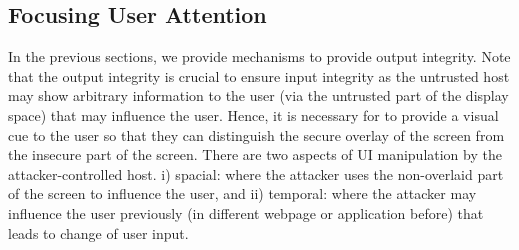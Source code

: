 



\subsection{Focusing User Attention}
\label{sec:systemDesign:userAttention}

In the previous sections, we provide mechanisms to provide output integrity. Note that the output integrity is crucial to ensure input integrity as the untrusted host may show arbitrary information to the user (via the untrusted part of the display space) that may influence the user. Hence, it is necessary for \name to provide a visual cue to the user so that they can distinguish the secure overlay of the screen from the insecure part of the screen. There are two aspects of UI manipulation by the attacker-controlled host. i) spacial: where the attacker uses the non-overlaid part of the screen to influence the user, and ii) temporal: where the attacker may influence the user previously (in different webpage or application before) that leads to change of user input.

